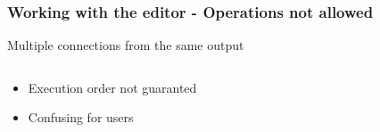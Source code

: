 \begin{frame}
    \frametitle{Working with the editor - Operations not allowed}
    Multiple connections from the same output
    \vspace*{1em}
    \begin{columns}
        \begin{column}{0.7\textwidth}
        \end{column}
        \begin{column}{0.3\textwidth}
        \end{column}
    \end{columns}
    \begin{itemize}
        \item Execution order not guaranted
        \item Confusing for users
    \end{itemize}
\end{frame}

